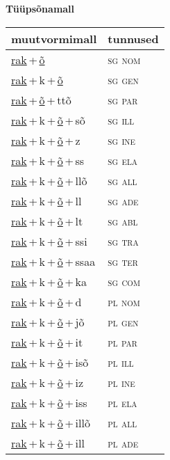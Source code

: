 
\vspace{1.8em}
\begin{minipage}{\textwidth}
\textbf{Tüüpsõnamall \,}\\

\begin{sideways}
\begin{tabular}{l l}
muutvormimall & tunnused \\
\hline
\underline{rak}\,+\,\underline{õ} & \textsc{ sg nom } \\
\underline{rak}\,+\,k\,+\,\underline{õ} & \textsc{ sg gen } \\
\underline{rak}\,+\,\underline{õ}\,+\,ttõ & \textsc{ sg par } \\
\underline{rak}\,+\,k\,+\,\underline{õ}\,+\,sõ & \textsc{ sg ill } \\
\underline{rak}\,+\,k\,+\,\underline{õ}\,+\,z & \textsc{ sg ine } \\
\underline{rak}\,+\,k\,+\,\underline{õ}\,+\,ss & \textsc{ sg ela } \\
\underline{rak}\,+\,k\,+\,\underline{õ}\,+\,llõ & \textsc{ sg all } \\
\underline{rak}\,+\,k\,+\,\underline{õ}\,+\,ll & \textsc{ sg ade } \\
\underline{rak}\,+\,k\,+\,\underline{õ}\,+\,lt & \textsc{ sg abl } \\
\underline{rak}\,+\,k\,+\,\underline{õ}\,+\,ssi & \textsc{ sg tra } \\
\underline{rak}\,+\,k\,+\,\underline{õ}\,+\,ssaa & \textsc{ sg ter } \\
\underline{rak}\,+\,k\,+\,\underline{õ}\,+\,ka & \textsc{ sg com } \\
\underline{rak}\,+\,k\,+\,\underline{õ}\,+\,d & \textsc{ pl nom } \\
\underline{rak}\,+\,k\,+\,\underline{õ}\,+\,jõ & \textsc{ pl gen } \\
\underline{rak}\,+\,k\,+\,\underline{õ}\,+\,it & \textsc{ pl par } \\
\underline{rak}\,+\,k\,+\,\underline{õ}\,+\,isõ & \textsc{ pl ill } \\
\underline{rak}\,+\,k\,+\,\underline{õ}\,+\,iz & \textsc{ pl ine } \\
\underline{rak}\,+\,k\,+\,\underline{õ}\,+\,iss & \textsc{ pl ela } \\
\underline{rak}\,+\,k\,+\,\underline{õ}\,+\,illõ & \textsc{ pl all } \\
\underline{rak}\,+\,k\,+\,\underline{õ}\,+\,ill & \textsc{ pl ade } \\

\end{tabular}
\end{sideways}
\end{minipage}
